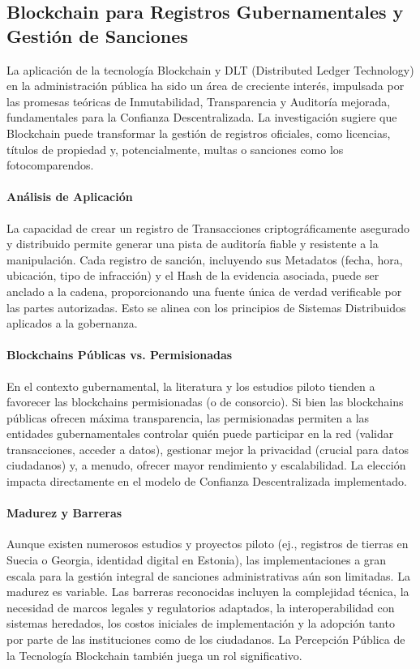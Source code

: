 \documentclass[
    letterpaper, 
    man,   
    spanish,
    12pt,
    donotrepeattitle,
    floatsintext,
    hidelinks %
]{apa7}
\begin{document}
\subsection{Blockchain para Registros Gubernamentales y Gestión de Sanciones} 

La aplicación de la tecnología Blockchain y DLT (Distributed Ledger Technology) en la administración pública ha sido un área de creciente interés, impulsada por las promesas teóricas de Inmutabilidad, Transparencia y Auditoría mejorada, fundamentales para la Confianza Descentralizada. La investigación sugiere que Blockchain puede transformar la gestión de registros oficiales, como licencias, títulos de propiedad y, potencialmente, multas o sanciones como los fotocomparendos. 

\paragraph{Análisis de Aplicación}
La capacidad de crear un registro de Transacciones criptográficamente asegurado y distribuido permite generar una pista de auditoría fiable y resistente a la manipulación. Cada registro de sanción, incluyendo sus Metadatos (fecha, hora, ubicación, tipo de infracción) y el Hash de la evidencia asociada, puede ser anclado a la cadena, proporcionando una fuente única de verdad verificable por las partes autorizadas. Esto se alinea con los principios de Sistemas Distribuidos aplicados a la gobernanza. 

\paragraph{Blockchains Públicas vs. Permisionadas}
En el contexto gubernamental, la literatura y los estudios piloto tienden a favorecer las blockchains permisionadas (o de consorcio). Si bien las blockchains públicas ofrecen máxima transparencia, las permisionadas permiten a las entidades gubernamentales controlar quién puede participar en la red (validar transacciones, acceder a datos), gestionar mejor la privacidad (crucial para datos ciudadanos) y, a menudo, ofrecer mayor rendimiento y escalabilidad. La elección impacta directamente en el modelo de Confianza Descentralizada implementado. 

\paragraph{Madurez y Barreras}
Aunque existen numerosos estudios y proyectos piloto (ej., registros de tierras en Suecia o Georgia, identidad digital en Estonia), las implementaciones a gran escala para la gestión integral de sanciones administrativas aún son limitadas. La madurez es variable. Las barreras reconocidas incluyen la complejidad técnica, la necesidad de marcos legales y regulatorios adaptados, la interoperabilidad con sistemas heredados, los costos iniciales de implementación y la adopción tanto por parte de las instituciones como de los ciudadanos. La Percepción Pública de la Tecnología Blockchain también juega un rol significativo. 
\end{document}
